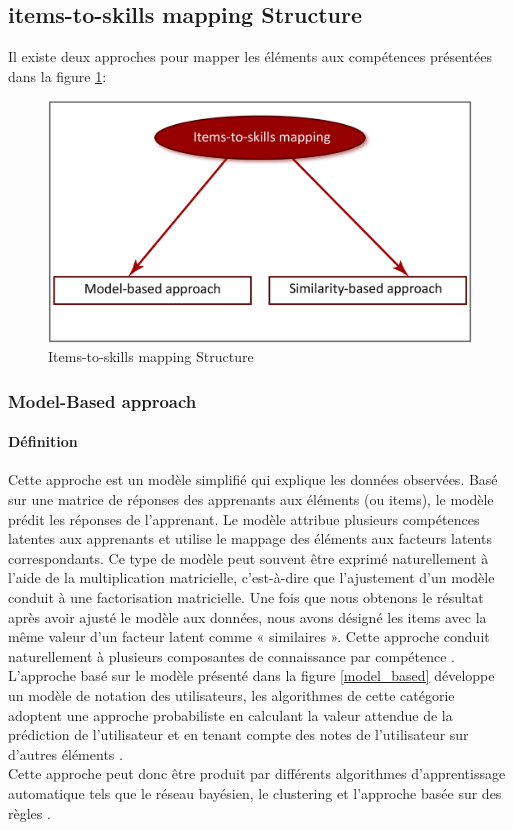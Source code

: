 \subsection{items-to-skills mapping Structure}
Il existe deux approches pour mapper les éléments aux compétences présentées dans la figure \ref{items_to_skills_mapping}:

\begin{figure}[H]
	\begin{center}
		\includegraphics[width=\textwidth]{images/chapitre3/Items_mapping_structure.png}
	\end{center}
\caption{Items-to-skills mapping Structure}
\label{items_to_skills_mapping}
\end{figure}

\subsubsection{Model-Based approach}
\paragraph{Définition}
Cette approche est un modèle simplifié qui explique les données observées. Basé sur une matrice de réponses des apprenants aux éléments (ou items), le modèle prédit les réponses de l’apprenant. Le modèle attribue plusieurs compétences latentes aux apprenants et utilise le mappage des éléments aux facteurs latents correspondants. Ce type de modèle peut souvent être exprimé naturellement à l’aide de la multiplication matricielle, c’est-à-dire que l’ajustement d’un modèle conduit à une factorisation matricielle. Une fois que nous obtenons le résultat après avoir ajusté le modèle aux données, nous avons désigné les items avec la même valeur d’un facteur latent comme « similaires ». Cette approche conduit naturellement à plusieurs composantes de connaissance par compétence \cite{pelanek2018measuring}. L’approche basé sur le modèle présenté dans la figure \ref{model_based} développe un modèle de notation des utilisateurs, les algorithmes de cette catégorie adoptent une approche probabiliste en calculant la valeur attendue de la prédiction de l’utilisateur et en tenant compte des notes de l’utilisateur sur d’autres éléments \cite{item_based_recommendation_algo}. \\
Cette approche peut donc être produit par différents algorithmes d’apprentissage automatique tels que le réseau bayésien, le clustering et l’approche basée sur des règles \cite{breese2013empirical}.

